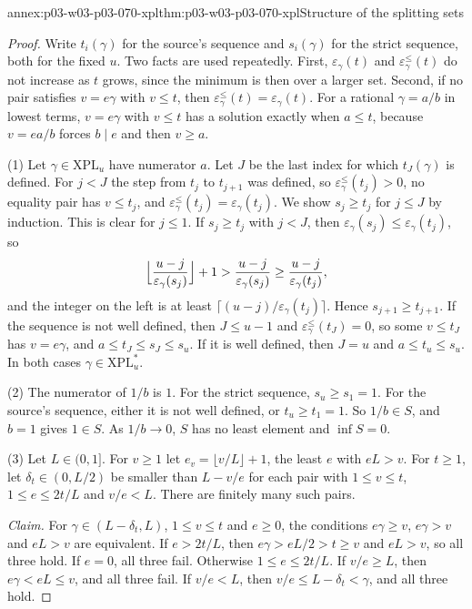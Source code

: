 \begin{annexitem}{annex:p03-w03-p03-070-xpl}{thm:p03-w03-p03-070-xpl}{Structure of the splitting sets}
\begin{proof}
Write \(t_i(\gamma)\) for the source's sequence and \(s_i(\gamma)\) for the
strict sequence, both for the fixed \(u\).  Two facts are used repeatedly.
First, \(\varepsilon_\gamma(t)\) and \(\varepsilon^{\leq}_\gamma(t)\) do not
increase as \(t\) grows, since the minimum is then over a larger set.  Second,
if no pair satisfies \(v=e\gamma\) with \(v\leq t\), then
\(\varepsilon^{\leq}_\gamma(t)=\varepsilon_\gamma(t)\).  For a rational
\(\gamma=a/b\) in lowest terms, \(v=e\gamma\) with \(v\leq t\) has a solution
exactly when \(a\leq t\), because \(v=ea/b\) forces \(b\mid e\) and then
\(v\geq a\).

(1) Let \(\gamma\in\mathrm{XPL}_u\) have numerator \(a\).  Let \(J\) be the
last index for which \(t_J(\gamma)\) is defined.  For \(j<J\) the step from
\(t_j\) to \(t_{j+1}\) was defined, so \(\varepsilon^{\leq}_\gamma(t_j)>0\), no
equality pair has \(v\leq t_j\), and
\(\varepsilon^{\leq}_\gamma(t_j)=\varepsilon_\gamma(t_j)\).  We show
\(s_j\geq t_j\) for \(j\leq J\) by induction.  This is clear for \(j\leq1\).
If \(s_j\geq t_j\) with \(j<J\), then
\(\varepsilon_\gamma(s_j)\leq\varepsilon_\gamma(t_j)\), so
\[
 \Bigl\lfloor\frac{u-j}{\varepsilon_\gamma(s_j)}\Bigr\rfloor+1
 >\frac{u-j}{\varepsilon_\gamma(s_j)}\geq\frac{u-j}{\varepsilon_\gamma(t_j)} ,
\]
and the integer on the left is at least \(\lceil(u-j)/\varepsilon_\gamma(t_j)\rceil\).
Hence \(s_{j+1}\geq t_{j+1}\).  If the sequence is not well defined, then
\(J\leq u-1\) and \(\varepsilon^{\leq}_\gamma(t_J)=0\), so some \(v\leq t_J\)
has \(v=e\gamma\), and \(a\leq t_J\leq s_J\leq s_u\).  If it is well defined,
then \(J=u\) and \(a\leq t_u\leq s_u\).  In both cases
\(\gamma\in\mathrm{XPL}^\ast_u\).

(2) The numerator of \(1/b\) is \(1\).  For the strict sequence,
\(s_u\geq s_1=1\).  For the source's sequence, either it is not well defined,
or \(t_u\geq t_1=1\).  So \(1/b\in S\), and \(b=1\) gives \(1\in S\).  As
\(1/b\to0\), \(S\) has no least element and \(\inf S=0\).

(3) Let \(L\in(0,1]\).  For \(v\geq1\) let \(e_v=\lfloor v/L\rfloor+1\), the
least \(e\) with \(eL>v\).  For \(t\geq1\), let \(\delta_t\in(0,L/2)\) be
smaller than \(L-v/e\) for each pair with \(1\leq v\leq t\),
\(1\leq e\leq2t/L\) and \(v/e<L\).  There are finitely many such pairs.

\emph{Claim.}  For \(\gamma\in(L-\delta_t,L)\), \(1\leq v\leq t\) and \(e\geq0\),
the conditions \(e\gamma\geq v\), \(e\gamma>v\) and \(eL>v\) are equivalent.
If \(e>2t/L\), then \(e\gamma>eL/2>t\geq v\) and \(eL>v\), so all three hold.
If \(e=0\), all three fail.  Otherwise \(1\leq e\leq2t/L\).  If
\(v/e\geq L\), then \(e\gamma<eL\leq v\), and all three fail.  If
\(v/e<L\), then \(v/e\leq L-\delta_t<\gamma\), and all three hold.


\end{proof}
\end{annexitem}
